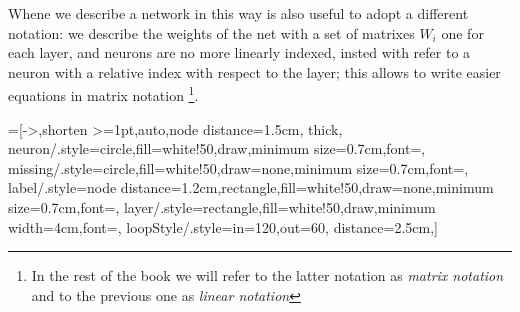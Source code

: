 Whene we describe a network in this way is also useful to adopt a different notation: we describe the weights of the net with a set of matrixes $W_i$ one for each layer, and neurons are no more
linearly indexed, insted with refer to a neuron with a relative index with respect to the layer; this allows to write easier equations in matrix notation
\footnote{In the rest of the book we will refer to the latter notation as \textsl{matrix notation} and to the previous one as \textsl{linear notation}}.


=[->,shorten >=1pt,auto,node distance=1.5cm,
  thick,
  neuron/.style={circle,fill=white!50,draw,minimum size=0.7cm,font=\sffamily\Large\bfseries},
  missing/.style={circle,fill=white!50,draw=none,minimum size=0.7cm,font=\sffamily\Huge\bfseries},
  label/.style={node distance=1.2cm,rectangle,fill=white!50,draw=none,minimum size=0.7cm,font=\sffamily\normalsize},
  layer/.style={rectangle,fill=white!50,draw,minimum width=4cm,font=\sffamily\normalsize},
  loopStyle/.style={in=120,out=60, distance=2.5cm},]
